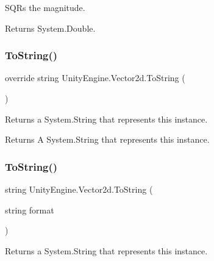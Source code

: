 S\+Q\+Rs the magnitude. 

\begin{DoxyReturn}{Returns}
System.\+Double.
\end{DoxyReturn}
\mbox{\label{struct_unity_engine_1_1_vector2d_a0e32225a9621ae1a91e11852b9dae864}} 
\subsubsection{\texorpdfstring{To\+String()}{ToString()}\hspace{0.1cm}{\footnotesize\ttfamily [1/2]}}
{\footnotesize\ttfamily override string Unity\+Engine.\+Vector2d.\+To\+String (\begin{DoxyParamCaption}{ }\end{DoxyParamCaption})\hspace{0.3cm}{\ttfamily [inline]}}



Returns a System.\+String that represents this instance. 

\begin{DoxyReturn}{Returns}
A System.\+String that represents this instance.
\end{DoxyReturn}
\mbox{\label{struct_unity_engine_1_1_vector2d_aaad542045077ef1699a3299a29848100}} 
\subsubsection{\texorpdfstring{To\+String()}{ToString()}\hspace{0.1cm}{\footnotesize\ttfamily [2/2]}}
{\footnotesize\ttfamily string Unity\+Engine.\+Vector2d.\+To\+String (\begin{DoxyParamCaption}\item[{string}]{format }\end{DoxyParamCaption})\hspace{0.3cm}{\ttfamily [inline]}}



Returns a System.\+String that represents this instance. 


